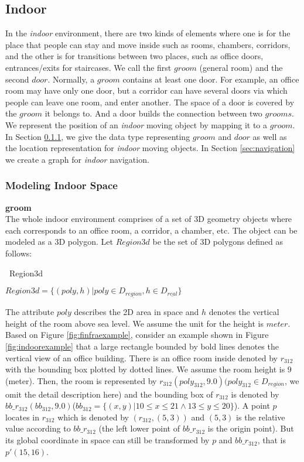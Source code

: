 \subsection{Indoor}
\label{sec:indoor}
In the \textit{indoor} environment, there are two kinds of elements where one is for the place that people can stay and move inside such as rooms, chambers, corridors, and the other is for transitions 
between two places, such as office doors, entrances/exits for staircases. 
We call the first $groom$ (general room) and the second $door$. 
Normally, a $groom$ contains at least one door. For example, an office room may have only 
one door, but a corridor can have several doors via which people can leave 
one room, and enter another. The space of a door is covered by the $groom$ it belongs to. 
And a door builds the connection between two $grooms$. 
We represent the position of an \textit{indoor} moving object by mapping it to a $groom$. In Section \ref{sec:modelingindoorspace}, we give the data type representing $groom$ and $door$ as well as the location representation for \textit{indoor} moving objects. In Section \ref{sec:navigation} we create a graph for \textit{indoor} navigation. 
\subsubsection{Modeling Indoor Space}
\label{sec:modelingindoorspace}
\textbf{groom} \\
 
The whole indoor environment comprises of a set of 3D geometry objects where each
corresponds to an office room, a corridor, a chamber, etc. The object can be modeled as a 
3D polygon. Let $Region3d$ be the set of 3D polygons defined as follows: 

\begin{Statement}
\label{3dregion}
\ Region3d 

$Region3d=\{(poly,h)|poly \in D_{\underline{region}},
h \in D_{\underline{real}}\}$
\end{Statement}

The attribute $poly$ describes the 2D area in space and $h$ denotes the vertical height of the room above sea level. We assume the unit for the height is $meter$. Based on Figure \ref{fig:finfraexample}, 
consider an example shown in Figure \ref{fig:indoorexample} that 
a large rectangle bounded by bold lines denotes the vertical view of an office building. 
There is an office room inside denoted by $r_{312}$ with the bounding box plotted by dotted lines. We assume the room height is $9$ (meter). Then, the room is represented by $r_{312}(poly_{312},9.0)(poly_{312} \in D_{\underline{region}}$, we omit the detail description here) and the bounding box of $r_{312}$ is denoted by $bb\_r_{312}(bb_{312},9.0)$($bb_{312}=\{(x,y)|10\leq x\leq 21\wedge 13 \leq y \leq 20\}$). A point $p$ locates in $r_{312}$ which is denoted by $(r_{312},(5,3))$ and $(5,3)$ is the relative value according to $bb\_r_{312}$ (the left lower point of $bb\_r_{312}$ is the origin point). 
But its global coordinate in space can still be transformed by $p$ and $bb\_r_{312}$, 
that is $p'(15,16)$. \\

